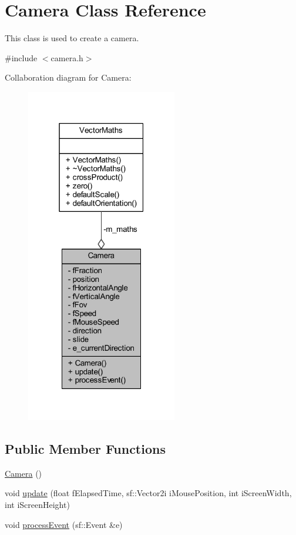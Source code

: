 \hypertarget{class_camera}{}\section{Camera Class Reference}
\label{class_camera}


This class is used to create a camera.  




{\ttfamily \#include $<$camera.\+h$>$}



Collaboration diagram for Camera\+:\nopagebreak
\begin{figure}[H]
\begin{center}
\leavevmode
\includegraphics[width=187pt]{class_camera__coll__graph}
\end{center}
\end{figure}
\subsection*{Public Member Functions}
\begin{DoxyCompactItemize}
\item 
\hyperlink{class_camera_a01f94c3543f56ede7af49dc778f19331}{Camera} ()
\item 
void \hyperlink{class_camera_a63a7ff68975d02c10e421439685adff0}{update} (float f\+Elapsed\+Time, sf\+::\+Vector2i i\+Mouse\+Position, int i\+Screen\+Width, int i\+Screen\+Height)
\item 
void \hyperlink{class_camera_a62fb0fe8f7e8ea62124a74cb41416b68}{process\+Event} (sf\+::\+Event \&e)
\end{DoxyCompactItemize}
